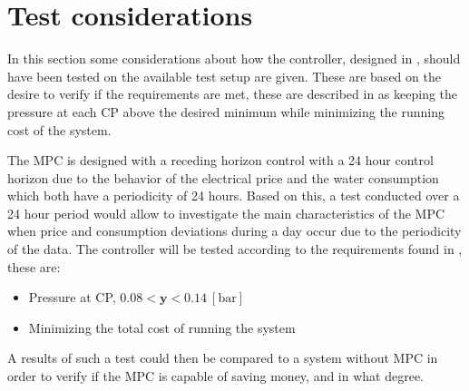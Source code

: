 \chapter{Test considerations}
\label{sec:MPT_test}

In this section some considerations about how the controller, designed in , should have been tested on the available test setup are given. These are based on the desire to verify if the requirements are met, these are described in  as keeping the pressure at each CP above the desired minimum while minimizing the running cost of the system.


The MPC is designed with a receding horizon control with a 24 hour control horizon due to the behavior of the electrical price and the water consumption which both have a periodicity of 24 hours. 
Based on this, a test conducted over a 24 hour period would allow to investigate the main characteristics of the MPC when price and consumption deviations during a day occur due to the periodicity of the data. The controller will be tested according to the requirements found in , these are: 
\begin{itemize}
	\item Pressure at CP, $0.08 < \bm{y} < 0.14 \:[\text{bar}]$
%
	\item Minimizing the total cost of running the system
\end{itemize}    

A results of such a test could then be compared to a system without MPC in order to verify if the MPC is capable of saving money, and in what degree.  



